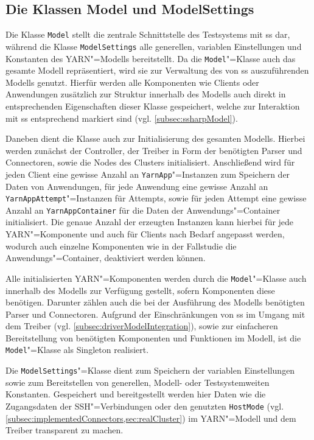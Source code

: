 \subsection{Die Klassen Model und ModelSettings}
\label{subsec:modelClass}

Die Klasse \texttt{Model} stellt die zentrale Schnittstelle des Testsystems mit \ac{ss} dar, während die Klasse \texttt{ModelSettings} alle generellen, variablen Einstellungen und Konstanten des \ac{YARN}"=Modells bereitstellt.
Da die \texttt{Model}"=Klasse auch das gesamte Modell repräsentiert, wird sie zur Verwaltung des von \ac{ss} auszuführenden Modells genutzt.
Hierfür werden alle Komponenten wie Clients oder Anwendungen zusätzlich zur Struktur innerhalb des Modells auch direkt in entsprechenden Eigenschaften dieser Klasse gespeichert, welche zur Interaktion mit \ac{ss} entsprechend markiert sind (vgl. \cref{subsec:ssharpModel}).

Daneben dient die Klasse auch zur Initialisierung des gesamten Modells.
Hierbei werden zunächst der Controller, der Treiber in Form der benötigten Parser und Connectoren, sowie die Nodes des Clusters initialisiert.
Anschließend wird für jeden Client eine gewisse Anzahl an \texttt{YarnApp}"=Instanzen zum Speichern der Daten von Anwendungen, für jede Anwendung eine gewisse Anzahl an \texttt{YarnAppAttempt}"=Instanzen für Attempts, sowie für jeden Attempt eine gewisse Anzahl an \texttt{YarnAppContainer} für die Daten der Anwendungs"=Container initialisiert.
Die genaue Anzahl der erzeugten Instanzen kann hierbei für jede \ac{YARN}"=Komponente und auch für Clients nach Bedarf angepasst werden, wodurch auch einzelne Komponenten wie \zB in der Fallstudie die Anwendungs"=Container, deaktiviert werden können.

Alle initialisierten \ac{YARN}"=Komponenten werden durch die \texttt{Model}"=Klasse auch innerhalb des Modells zur Verfügung gestellt, sofern Komponenten diese benötigen.
Darunter zählen auch die bei der Ausführung des Modells benötigten Parser und Connectoren.
Aufgrund der Einschränkungen von \ac{ss} im Umgang mit dem Treiber (vgl. \cref{subsec:driverModelIntegration}), sowie zur einfacheren Bereitstellung von benötigten Komponenten und Funktionen im Modell, ist die \texttt{Model}"=Klasse als Singleton realisiert.

Die \texttt{ModelSettings}"=Klasse dient zum Speichern der variablen Einstellungen sowie zum Bereitstellen von generellen, Modell- oder Testsystemweiten Konstanten.
Gespeichert und bereitgestellt werden hier Daten wie \zB die Zugangsdaten der SSH"=Verbindungen oder den genutzten \texttt{HostMode} (vgl.  \cref{subsec:implementedConnectors,sec:realCluster}) im \ac{YARN}"=Modell und dem Treiber transparent zu machen.

